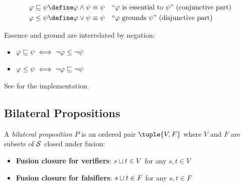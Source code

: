 \documentclass[../LogosReference.tex]{subfiles}
\begin{document}
\begin{definition}\label{def:essence-ground}
	\begin{align}
		\metaA \essence \metaB & \define \metaA \land \metaB \equiv \metaB &  & \text{``$\metaA$ is essential to $\metaB$'' (conjunctive part)} \\
		\metaA \ground \metaB  & \define \metaA \lor \metaB \equiv \metaB  &  & \text{``$\metaA$ grounds $\metaB$'' (disjunctive part)}
	\end{align}
\end{definition}

\begin{remark}
	Essence and ground are interrelated by negation:
	\begin{itemize}
		\item $\varphi \sqsubseteq \psi \iff \neg\varphi \leq \neg\psi$
		\item $\varphi \leq \psi \iff \neg\varphi \sqsubseteq \neg\psi$
	\end{itemize}
\end{remark}

\noindent
See  for the implementation.


\subsection{Bilateral Propositions}\label{sec:bilateral-propositions}

\begin{definition}\label{def:bilateral-proposition}
	A \emph{bilateral proposition} $P$ is an ordered pair $\tuple{V, F}$ where $V$ and $F$ are subsets of $\mathcal{S}$ closed under fusion:
	\begin{itemize}
		\item \textbf{Fusion closure for verifiers}: $s\sqcup t \in V$ for any $s, t \in V$
		\item \textbf{Fusion closure for falsifiers}: $s\sqcup t \in F$ for any $s, t \in F$
	\end{itemize}
\end{definition}

\end{document}
